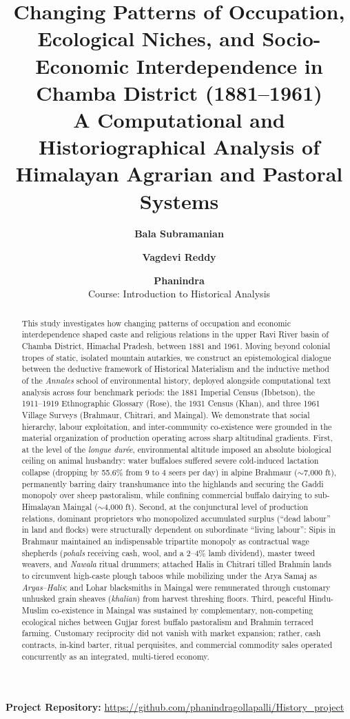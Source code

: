 \documentclass[11pt,a4paper]{article}
\title{\Large\textbf{Changing Patterns of Occupation, Ecological Niches, and Socio-Economic Interdependence in Chamba District (1881--1961)}\\[0.4em]
\large A Computational and Historiographical Analysis of Himalayan Agrarian and Pastoral Systems}
\author{
    \textbf{Bala Subramanian} \and 
    \textbf{Vagdevi Reddy} \and 
    \textbf{Phanindra} \\[0.5em]
    \normalsize Course: Introduction to Historical Analysis
}
\date{}
\begin{document}
\maketitle

\noindent\textbf{Project Repository:} \url{https://github.com/phanindragollapalli/History_project}

\vspace{0.8em}

\begin{abstract}
This study investigates how changing patterns of occupation and economic interdependence shaped caste and religious relations in the upper Ravi River basin of Chamba District, Himachal Pradesh, between 1881 and 1961. Moving beyond colonial tropes of static, isolated mountain autarkies, we construct an epistemological dialogue between the deductive framework of Historical Materialism and the inductive method of the \textit{Annales} school of environmental history, deployed alongside computational text analysis across four benchmark periods: the 1881 Imperial Census (Ibbetson), the 1911--1919 Ethnographic Glossary (Rose), the 1931 Census (Khan), and three 1961 Village Surveys (Brahmaur, Chitrari, and Maingal). We demonstrate that social hierarchy, labour exploitation, and inter-community co-existence were grounded in the material organization of production operating across sharp altitudinal gradients. First, at the level of the \textit{longue dur\'ee}, environmental altitude imposed an absolute biological ceiling on animal husbandry: water buffaloes suffered severe cold-induced lactation collapse (dropping by 55.6\% from 9 to 4 seers per day) in alpine Brahmaur ($\sim$7,000 ft), permanently barring dairy transhumance into the highlands and securing the Gaddi monopoly over sheep pastoralism, while confining commercial buffalo dairying to sub-Himalayan Maingal ($\sim$4,000 ft). Second, at the conjunctural level of production relations, dominant proprietors who monopolized accumulated surplus (``dead labour'' in land and flocks) were structurally dependent on subordinate ``living labour'': Sipis in Brahmaur maintained an indispensable tripartite monopoly as contractual wage shepherds (\textit{pohals} receiving cash, wool, and a 2--4\% lamb dividend), master tweed weavers, and \textit{Nawala} ritual drummers; attached Halis in Chitrari tilled Brahmin lands to circumvent high-caste plough taboos while mobilizing under the Arya Samaj as \textit{Aryas--Halis}; and Lohar blacksmiths in Maingal were remunerated through customary unhusked grain sheaves (\textit{khalian}) from harvest threshing floors. Third, peaceful Hindu-Muslim co-existence in Maingal was sustained by complementary, non-competing ecological niches between Gujjar forest buffalo pastoralism and Brahmin terraced farming. Customary reciprocity did not vanish with market expansion; rather, cash contracts, in-kind barter, ritual perquisites, and commercial commodity sales operated concurrently as an integrated, multi-tiered economy.
\end{abstract}
\end{document}

